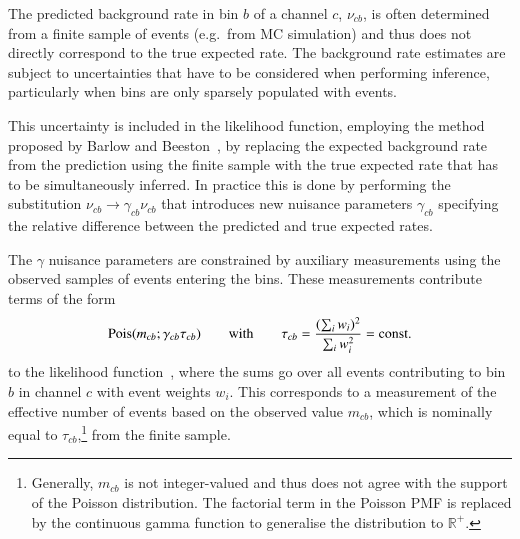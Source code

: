 The predicted background rate in bin $b$ of a channel $c$, $\nu_{cb}$, is often
determined from a finite sample of events (e.g.\ from MC simulation) and thus
does not directly correspond to the true expected rate. The background rate
estimates are subject to uncertainties that have to be considered when
performing inference, particularly when bins are only sparsely populated with
events.

This uncertainty is included in the likelihood function, employing the method
proposed by Barlow and Beeston~\cite{barlow1993}, by replacing the expected
background rate from the prediction using the finite sample with the true
expected rate that has to be simultaneously inferred. In practice this is done
by performing the substitution $\nu_{cb} \rightarrow \gamma_{cb} \nu_{cb}$ that
introduces new nuisance parameters $\gamma_{cb}$ specifying the relative
difference between the predicted and true expected rates.

The $\gamma$ nuisance parameters are constrained by auxiliary measurements using
the observed samples of events entering the bins. These measurements contribute
terms of the form
\begin{align*}
  \operatorname{Pois}(m_{cb} ; \gamma_{cb} \tau_{cb})
  \qquad \text{with} \qquad
  \tau_{cb} = \frac{( \sum_i w_i )^2}{\sum_i w_i^2} = \text{const.}
\end{align*}
to the likelihood function~\cite{cranmer2012}, where the sums go over all events
contributing to bin $b$ in channel $c$ with event weights $w_i$. This
corresponds to a measurement of the effective number of events based on the
observed value $m_{cb}$, which is nominally equal to
$\tau_{cb}$,\footnote{Generally, $m_{cb}$ is not integer-valued and thus does
  not agree with the support of the Poisson distribution. The factorial term in
  the Poisson PMF is replaced by the continuous gamma function to generalise the
  distribution to $\mathbb{R}^+$.} from the finite sample.

